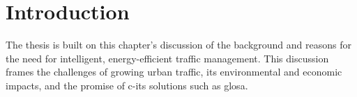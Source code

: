 \chapter{Introduction}
\label{ch:Introduction}
The thesis is built on this chapter's discussion of the background and reasons for the need for intelligent, energy-efficient traffic management. This discussion frames the challenges of growing urban traffic, its environmental and economic impacts, and the promise of \ac{c-its} solutions such as \ac{glosa}.







